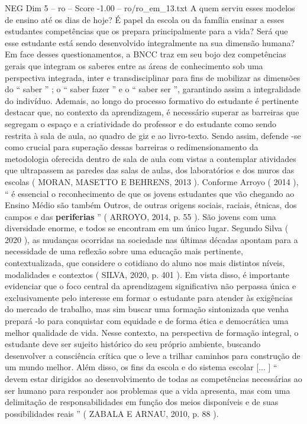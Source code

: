 \begin{textsample}{NEG Dim 5 – ro – Score -1.00 – ro/ro\_em\_13.txt}
A quem serviu esses modelos de ensino até os dias de hoje?
É papel da escola ou da família ensinar a esses estudantes competências que os prepara principalmente para a vida?
Será que esse estudante está sendo desenvolvido integralmente na sua dimensão humana?
Em face desses questionamentos, a BNCC traz em seu bojo dez competências gerais que integram os saberes entre as áreas de conhecimento sob uma perspectiva integrada, inter e transdisciplinar para fins de mobilizar as dimensões do “ saber ” ; o “ saber fazer ” e o “ saber ser ”, garantindo assim a integralidade do indivíduo.
Ademais, ao longo do processo formativo do estudante é pertinente destacar que, no contexto da aprendizagem, é necessário superar as barreiras que segregam o espaço e a criatividade do professor e do estudante como sendo restrita à sala de aula, ao quadro de giz e ao livro-texto.
Sendo assim, defende -se como crucial para superação dessas barreiras o redimensionamento da metodologia oferecida dentro de sala de aula com vistas a contemplar atividades que ultrapassem as paredes das salas de aulas, dos laboratórios e dos muros das escolas ( MORAN, MASETTO E BEHRENS, 2013 ).
Conforme Arroyo ( 2014 ), “ é essencial o reconhecimento de que os jovens estudantes que vão chegando ao Ensino Médio são também Outros, de outras origens sociais, raciais, étnicas, dos campos e das \textbf{periferias} ” ( ARROYO, 2014, p. 55 ).
São jovens com uma diversidade enorme, e todos se encontram em um único lugar.
Segundo Silva ( 2020 ), as mudanças ocorridas na sociedade nas últimas décadas apontam para a necessidade de uma reflexão sobre uma educação mais pertinente, contextualizada, que considere o cotidiano do aluno nos mais distintos níveis, modalidades e contextos ( SILVA, 2020, p. 401 ).
Em vista disso, é importante evidenciar que o foco central da aprendizagem significativa não perpassa única e exclusivamente pelo interesse em formar o estudante para atender às exigências do mercado de trabalho, mas sim buscar uma formação sintonizada que venha prepará -lo para conquistar com equidade e de forma ética e democrática uma melhor qualidade de vida.
Nesse contexto, na perspectiva de formação integral, o estudante deve ser sujeito histórico do seu próprio ambiente, buscando desenvolver a consciência crítica que o leve a trilhar caminhos para construção de um mundo melhor.
Além disso, os fins da escola e do sistema escolar [... ] “ devem estar dirigidos ao desenvolvimento de todas as competências necessárias ao ser humano para responder aos problemas que a vida apresenta, mas com uma delimitação de responsabilidades em função dos meios disponíveis e de suas possibilidades reais ” ( ZABALA E ARNAU, 2010, p. 88 ).

\end{textsample}
